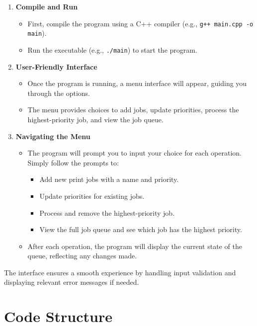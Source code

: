 \documentclass{article}
\begin{document}
   \begin{enumerate}
       \item \textbf{Compile and Run}
       \begin{itemize}
           \item First, compile the program using a C++ compiler (e.g., \texttt{g++ main.cpp -o main}).
           \item Run the executable (e.g., \texttt{./main}) to start the program.
       \end{itemize}
   
       \item \textbf{User-Friendly Interface}
       \begin{itemize}
           \item Once the program is running, a menu interface will appear, guiding you through the options.
           \item The menu provides choices to add jobs, update priorities, process the highest-priority job, and view the job queue.
       \end{itemize}
   
       \item \textbf{Navigating the Menu}
       \begin{itemize}
           \item The program will prompt you to input your choice for each operation. Simply follow the prompts to:
           \begin{itemize}
               \item Add new print jobs with a name and priority.
               \item Update priorities for existing jobs.
               \item Process and remove the highest-priority job.
               \item View the full job queue and see which job has the highest priority.
           \end{itemize}
           \item After each operation, the program will display the current state of the queue, reflecting any changes made.
       \end{itemize}
   \end{enumerate}
   
   The interface ensures a smooth experience by handling input validation and displaying relevant error messages if needed.
   

\section*{Code Structure}
\end{document}
